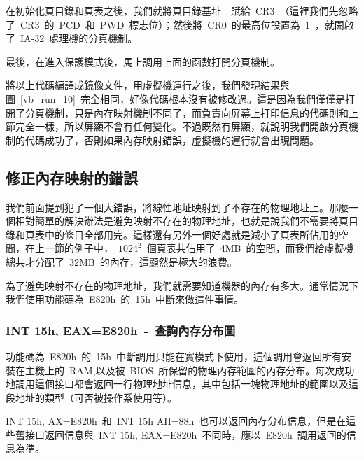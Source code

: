 在初始化頁目錄和頁表之後，我們就將頁目錄基址~~賦給~CR3~（這裡我們先忽略了~CR3~的~PCD~和~PWD~標志位）；然後將~CR0~的最高位設置為~1~，就開啟了~IA-32~處理機的分頁機制。

最後，在進入保護模式後，馬上調用上面的函數打開分頁機制。


將以上代碼編譯成鏡像文件，用虛擬機運行之後，我們發現結果與圖~\ref{vb_run_10}~完全相同，好像代碼根本沒有被修改過。這是因為我們僅僅是打開了分頁機制，只是內存映射機制不同了，而負責向屏幕上打印信息的代碼則和上節完全一樣，所以屏顯不會有任何變化。不過既然有屏顯，就說明我們開啟分頁機制的代碼成功了，否則如果內存映射錯誤，虛擬機的運行就會出現問題。

\subsection{修正內存映射的錯誤}

我們前面提到犯了一個大錯誤，將線性地址映射到了不存在的物理地址上。那麼一個相對簡單的解決辦法是避免映射不存在的物理地址，也就是說我們不需要將頁目錄和頁表中的條目全部用完。這樣還有另外一個好處就是減小了頁表所佔用的空間，在上一節的例子中，~$1024^2$~個頁表共佔用了~4MB~的空間，而我們給虛擬機總共才分配了~32MB~的內存，這顯然是極大的浪費。

為了避免映射不存在的物理地址，我們就需要知道機器的內存有多大。通常情況下我們使用功能碼為~E820h~的~15h~中斷來做這件事情。

\subsubsection{INT 15h, EAX=E820h~-~查詢內存分布圖}

功能碼為~E820h~的~15h~中斷調用只能在實模式下使用，這個調用會返回所有安裝在主機上的~RAM,以及被~BIOS~所保留的物理內存範圍的內存分布。每次成功地調用這個接口都會返回一行物理地址信息，其中包括一塊物理地址的範圍以及這段地址的類型（可否被操作系使用等）。

INT 15h, AX=E820h~和~INT 15h AH=88h~也可以返回內存分布信息，但是在這些舊接口返回信息與~INT 15h, EAX=E820h~不同時，應以~E820h~調用返回的信息為準。

